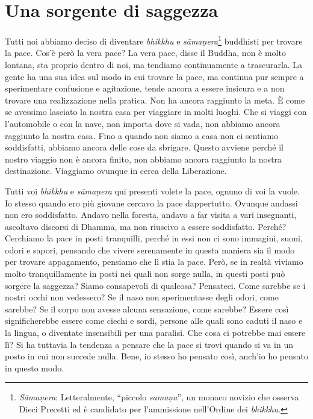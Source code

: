 \chapter{Una sorgente di saggezza}

Tutti noi abbiamo deciso di diventare \emph{bhikkhu} e
\emph{sāmaṇera}\footnote{\emph{Sāmaṇera}: Letteralmente, ``piccolo
  \emph{samaṇa}'', un monaco novizio che osserva Dieci Precetti ed è
  candidato per l'ammissione nell'Ordine dei \emph{bhikkhu}.} buddhisti
per trovare la pace. Cos'è però la vera pace? La vera pace, disse il
Buddha, non è molto lontana, sta proprio dentro di noi, ma tendiamo
continuamente a trascurarla. La gente ha una sua idea sul modo in cui
trovare la pace, ma continua pur sempre a sperimentare confusione e
agitazione, tende ancora a essere insicura e a non trovare una
realizzazione nella pratica. Non ha ancora raggiunto la meta. È come se
avessimo lasciato la nostra casa per viaggiare in molti luoghi. Che si
viaggi con l'automobile o con la nave, non importa dove si vada, non
abbiamo ancora raggiunto la nostra casa. Fino a quando non siamo a casa
non ci sentiamo soddisfatti, abbiamo ancora delle cose da sbrigare.
Questo avviene perché il nostro viaggio non è ancora finito, non abbiamo
ancora raggiunto la nostra destinazione. Viaggiamo ovunque in cerca
della Liberazione.

Tutti voi \emph{bhikkhu} e \emph{sāmaṇera} qui presenti volete la pace,
ognuno di voi la vuole. Io stesso quando ero più giovane cercavo la pace
dappertutto. Ovunque andassi non ero soddisfatto. Andavo nella foresta,
andavo a far visita a vari insegnanti, ascoltavo discorsi di Dhamma, ma
non riuscivo a essere soddisfatto. Perché? Cerchiamo la pace in posti
tranquilli, perché in essi non ci sono immagini, suoni, odori e sapori,
pensando che vivere serenamente in questa maniera sia il modo per
trovare appagamento, pensiamo che lì stia la pace. Però, se in realtà
viviamo molto tranquillamente in posti nei quali non sorge nulla, in
questi posti può sorgere la saggezza? Siamo consapevoli di qualcosa?
Pensateci. Come sarebbe se i nostri occhi non vedessero? Se il naso non
sperimentasse degli odori, come sarebbe? Se il corpo non avesse alcuna
sensazione, come sarebbe? Essere così significherebbe essere come ciechi
e sordi, persone alle quali sono caduti il naso e la lingua, o diventate
insensibili per una paralisi. Che cosa ci potrebbe mai essere lì? Si ha
tuttavia la tendenza a pensare che la pace si trovi quando si va in un
posto in cui non succede nulla. Bene, io stesso ho pensato così, anch'io
ho pensato in questo modo.


